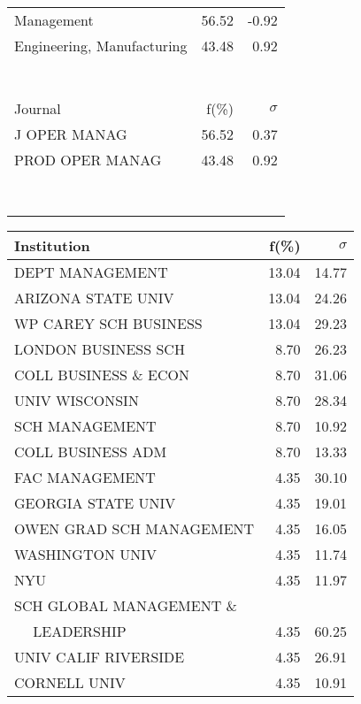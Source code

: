 \documentclass[a4paper,11pt]{report}
\begin{document}
\begin{landscape}
\begin{table}[!ht]
{\begin{tabular}{|l r  r|}
Management & 56.52 & -0.92\\
Engineering, Manufacturing & 43.48 & 0.92\\
 &  & \\
 &  & \\
 &  & \\
 &  & \\
 &  & \\
 &  & \\
 &  & \\
\hline
\hline
Journal & f(\%) & $\sigma$\\
\hline
J OPER MANAG & 56.52 & 0.37\\
PROD OPER MANAG & 43.48 & 0.92\\
 &  & \\
 &  & \\
 &  & \\
 &  & \\
 &  & \\
 &  & \\
 &  & \\
 &  & \\
\hline
\end{tabular}
}
{\scriptsize\begin{tabular}{|l r r|}
\hline
Institution & f(\%) & $\sigma$\\
\hline
DEPT MANAGEMENT & 13.04 & 14.77\\
ARIZONA STATE UNIV & 13.04 & 24.26\\
WP CAREY SCH BUSINESS & 13.04 & 29.23\\
LONDON BUSINESS SCH & 8.70 & 26.23\\
COLL BUSINESS \& ECON & 8.70 & 31.06\\
UNIV WISCONSIN & 8.70 & 28.34\\
SCH MANAGEMENT & 8.70 & 10.92\\
COLL BUSINESS ADM & 8.70 & 13.33\\
FAC MANAGEMENT & 4.35 & 30.10\\
GEORGIA STATE UNIV & 4.35 & 19.01\\
OWEN GRAD SCH MANAGEMENT & 4.35 & 16.05\\
WASHINGTON UNIV & 4.35 & 11.74\\
NYU & 4.35 & 11.97\\
SCH GLOBAL MANAGEMENT \& &  & \\
$\quad$ LEADERSHIP & 4.35 & 60.25\\
UNIV CALIF RIVERSIDE & 4.35 & 26.91\\
CORNELL UNIV & 4.35 & 10.91\\

\end{tabular}}
\end{table}
\end{landscape}
\end{document}
